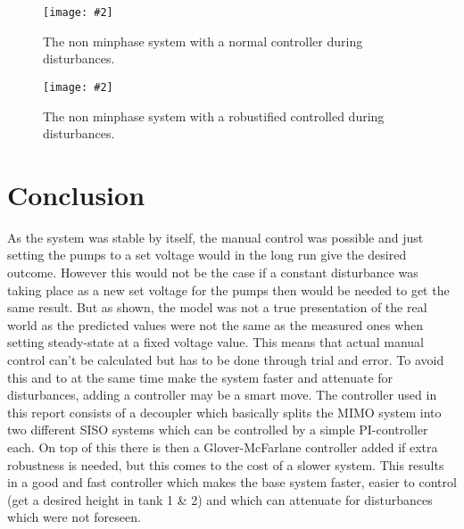 \documentclass[a4paper,12pt,oneside,onecolumn]{article}
\newcommand{\image}[3][width=.6\columnwidth]{
	\begin{figure}[h!]
		\centering
	    \texttt{[image: \#2]}
		\caption{#3}
		\label{fig:#2}
	\end{figure}
}
\begin{document}
\image{nmp_disturbance.eps}{The non minphase system with a normal controller during disturbances.}

\image{rnmp_disturbance.eps}{The non minphase system with a robustified controlled during disturbances.}

\FloatBarrier
\section{Conclusion}
As the system was stable by itself, the manual control was possible and just setting the pumps to a set voltage would in the long run give the desired outcome. However this would not be the case if a constant disturbance was taking place as a new set voltage for the pumps then would be needed to get the same result. But as shown, the model was not a true presentation of the real world as the predicted values were not the same as the measured ones when setting steady-state at a fixed voltage value. This means that actual manual control can't be calculated but has to be done through trial and error. To avoid this and to at the same time make the system faster and attenuate for disturbances, adding a controller may be a smart move. The controller used in this report consists of a decoupler which basically splits the MIMO system into two different SISO systems which can be controlled by a simple PI-controller each. On top of this there is then a Glover-McFarlane controller added if extra robustness is needed, but this comes to the cost of a slower system. This results in a good and fast controller which makes the base system faster, easier to control (get a desired height in tank 1 \& 2) and which can attenuate for disturbances which were not foreseen.
\end{document}
